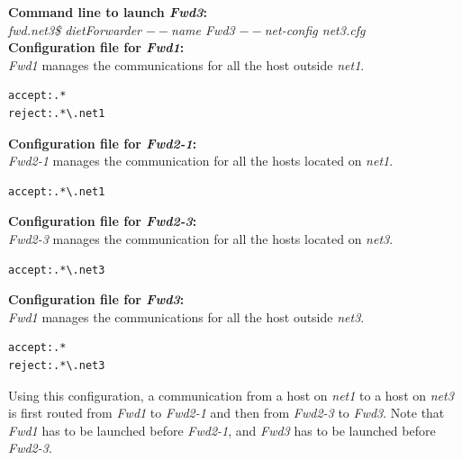 \noindent\textbf{Command line to launch \textit{Fwd3}: }\\
{\small \it fwd.net3\$ dietForwarder {\tiny$--$}name Fwd3
  {\tiny$--$}net-config net3.cfg}\\[3mm]

\noindent\textbf{Configuration file for \textit{Fwd1}:}\\
\textit{Fwd1} manages the communications for all the host outside
\textit{net1}.
\begin{verbatim}
accept:.*
reject:.*\.net1
\end{verbatim}

\noindent\textbf{Configuration file for \textit{Fwd2-1}:}\\
\textit{Fwd2-1} manages the communication for all the hosts located on
\textit{net1}.
\begin{verbatim}
accept:.*\.net1
\end{verbatim}

\noindent\textbf{Configuration file for \textit{Fwd2-3}:}\\
\textit{Fwd2-3} manages the communication for all the hosts located on
\textit{net3}.
\begin{verbatim}
accept:.*\.net3
\end{verbatim}

\noindent\textbf{Configuration file for \textit{Fwd3}:}\\
\textit{Fwd1} manages the communications for all the host outside
\textit{net3}.
\begin{verbatim}
accept:.*
reject:.*\.net3
\end{verbatim}

Using this configuration, a communication from a host on \textit{net1}
to a host on \textit{net3} is first routed from \textit{Fwd1} to
\textit{Fwd2-1} and then from \textit{Fwd2-3} to \textit{Fwd3}.
Note that \textit{Fwd1} has to be launched before \textit{Fwd2-1}, and
\textit{Fwd3} has to be launched before \textit{Fwd2-3}.